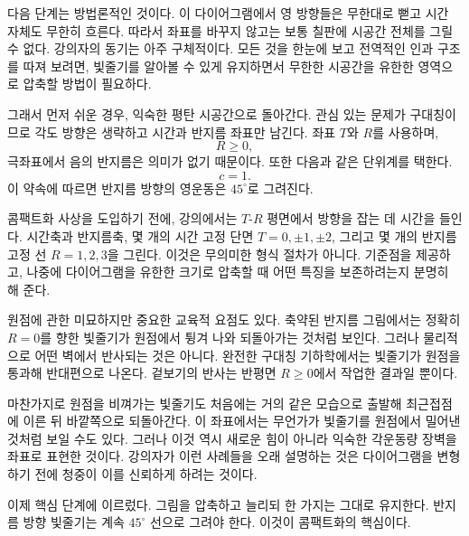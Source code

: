 다음 단계는 방법론적인 것이다. 이 다이어그램에서 영 방향들은 무한대로 뻗고 시간 자체도 무한히 흐른다. 따라서 좌표를 바꾸지 않고는 보통 칠판에 시공간 전체를 그릴 수 없다. 강의자의 동기는 아주 구체적이다. 모든 것을 한눈에 보고 전역적인 인과 구조를 따져 보려면, 빛줄기를 알아볼 수 있게 유지하면서 무한한 시공간을 유한한 영역으로 압축할 방법이 필요하다.

그래서 먼저 쉬운 경우, 익숙한 평탄 시공간으로 돌아간다. 관심 있는 문제가 구대칭이므로 각도 방향은 생략하고 시간과 반지름 좌표만 남긴다. 좌표 \(T\)와 \(R\)를 사용하며,
\[
R\ge 0,
\]
극좌표에서 음의 반지름은 의미가 없기 때문이다. 또한 다음과 같은 단위계를 택한다.
\[
c=1.
\]
이 약속에 따르면 반지름 방향의 영운동은 \(45^\circ\)로 그려진다.

콤팩트화 사상을 도입하기 전에, 강의에서는 \(T\)-\(R\) 평면에서 방향을 잡는 데 시간을 들인다. 시간축과 반지름축, 몇 개의 시간 고정 단면 \(T=0,\pm1,\pm2\), 그리고 몇 개의 반지름 고정 선 \(R=1,2,3\)을 그린다. 이것은 무의미한 형식 절차가 아니다. 기준점을 제공하고, 나중에 다이어그램을 유한한 크기로 압축할 때 어떤 특징을 보존하려는지 분명히 해 준다.

원점에 관한 미묘하지만 중요한 교육적 요점도 있다. 축약된 반지름 그림에서는 정확히 \(R=0\)를 향한 빛줄기가 원점에서 튕겨 나와 되돌아가는 것처럼 보인다. 그러나 물리적으로 어떤 벽에서 반사되는 것은 아니다. 완전한 구대칭 기하학에서는 빛줄기가 원점을 통과해 반대편으로 나온다. 겉보기의 반사는 반평면 \(R\ge 0\)에서 작업한 결과일 뿐이다.

마찬가지로 원점을 비껴가는 빛줄기도 처음에는 거의 같은 모습으로 출발해 최근접점에 이른 뒤 바깥쪽으로 되돌아간다. 이 좌표에서는 무언가가 빛줄기를 원점에서 밀어낸 것처럼 보일 수도 있다. 그러나 이것 역시 새로운 힘이 아니라 익숙한 각운동량 장벽을 좌표로 표현한 것이다. 강의자가 이런 사례들을 오래 설명하는 것은 다이어그램을 변형하기 전에 청중이 이를 신뢰하게 하려는 것이다.

이제 핵심 단계에 이르렀다. 그림을 압축하고 늘리되 한 가지는 그대로 유지한다. 반지름 방향 빛줄기는 계속 \(45^\circ\) 선으로 그려야 한다. 이것이 콤팩트화의 핵심이다.

\begin{classroomqa}
\end{classroomqa}

